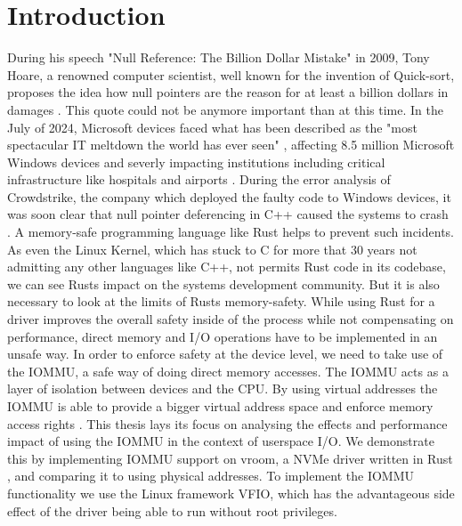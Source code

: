 \chapter{Introduction}\label{c:introduction}

During his speech "Null Reference: The Billion Dollar Mistake" in 2009, Tony Hoare, a renowned computer scientist, well known for the invention of Quick-sort, proposes the idea how null pointers are the reason for at least a billion dollars in damages \cite{billiondollarmistake}. This quote could not be anymore important than at this time. In the July of 2024, Microsoft devices faced what has been described as the "most spectacular IT meltdown the world has ever seen" \cite{bloombergmeltdown}, affecting 8.5 million Microsoft Windows devices and severly impacting institutions including critical infrastructure like hospitals and airports \cite{bloomberg8milliondevices}. During the error analysis of Crowdstrike, the company which deployed the faulty code to Windows devices, it was soon clear that null pointer deferencing in C++ caused the systems to crash \cite{heisenullpointer}. A memory-safe programming language like Rust helps to prevent such incidents. As even the Linux Kernel, which has stuck to C for more that 30 years not admitting any other languages like C++, not permits Rust code in its codebase, we can see Rusts impact on the systems development community. But it is also necessary to look at the limits of Rusts memory-safety. While using Rust for a driver improves the overall safety inside of the process while not compensating on performance, direct memory and I/O operations have to be implemented in an unsafe way. In order to enforce safety at the device level, we need to take use of the IOMMU, a safe way of doing direct memory accesses. The IOMMU acts as a layer of isolation between devices and the CPU. By using virtual addresses the IOMMU is able to provide a bigger virtual address space and enforce memory access rights \cite{OLS2007}.
This thesis lays its focus on analysing the effects and performance impact of using the IOMMU in the context of userspace I/O.
We demonstrate this by implementing IOMMU support on vroom, a NVMe driver written in Rust \cite{vroom}, and comparing it to using physical addresses. To implement the IOMMU functionality we use the Linux framework VFIO, which has the advantageous side effect of the driver being able to run without root privileges.
